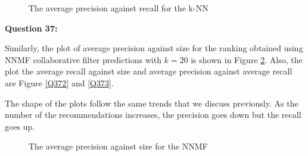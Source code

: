 \documentclass{article}
\begin{document}
\begin{figure}
\centering
{}
\caption{The average precision against recall for the k-NN} 
\label{Q363}
\end{figure}

\bigbreak \textbf{Question 37:}

Similarly, the plot of average precision against size for the ranking obtained using NNMF collaborative filter predictions with $k = 20$ is shown in Figure \ref{Q371}. Also, the plot the average recall against size and average precision against average recall are Figure \ref{Q372} and \ref{Q373}.

The shape of the plots follow the same trends that we discuss previously. As the number of the recommendations increases, the precision goes down but the recall goes up.

\begin{figure}
\centering
{}
\caption{The average precision against size for the NNMF} 
\label{Q371}
\end{figure}
\end{document}
